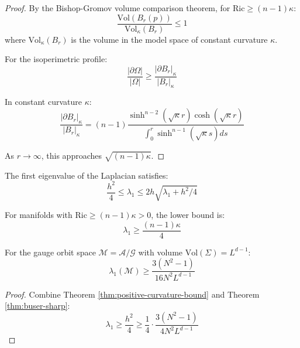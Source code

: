 \begin{proof}
By the Bishop-Gromov volume comparison theorem, for $\mathrm{Ric} \geq (n-1)\kappa$:
\begin{equation}
\frac{\mathrm{Vol}(B_r(p))}{\mathrm{Vol}_\kappa(B_r)} \leq 1
\end{equation}
where $\mathrm{Vol}_\kappa(B_r)$ is the volume in the model space of constant curvature $\kappa$.

For the isoperimetric profile:
\begin{equation}
\frac{|\partial \Omega|}{|\Omega|} \geq \frac{|\partial B_r|_\kappa}{|B_r|_\kappa}
\end{equation}

In constant curvature $\kappa$:
\begin{equation}
\frac{|\partial B_r|_\kappa}{|B_r|_\kappa} = (n-1)\frac{\sinh^{n-2}(\sqrt{\kappa}r)\cosh(\sqrt{\kappa}r)}{\int_0^r \sinh^{n-1}(\sqrt{\kappa}s)ds}
\end{equation}

As $r \to \infty$, this approaches $\sqrt{(n-1)\kappa}$.
\end{proof}

\begin{theorem}
\label{thm:buser-sharp}
The first eigenvalue of the Laplacian satisfies:
\begin{equation}
\frac{h^2}{4} \leq \lambda_1 \leq 2h\sqrt{\lambda_1 + h^2/4}
\end{equation}

For manifolds with $\mathrm{Ric} \geq (n-1)\kappa > 0$, the lower bound is:
\begin{equation}
\lambda_1 \geq \frac{(n-1)\kappa}{4}
\end{equation}
\end{theorem}

\begin{theorem}
\label{thm:spectral-gap-orbit}
For the gauge orbit space $\mathcal{M} = \mathcal{A}/\mathcal{G}$ with volume 
$\mathrm{Vol}(\Sigma) = L^{d-1}$:
\begin{equation}
\lambda_1(\mathcal{M}) \geq \frac{3(N^2-1)}{16N^2 L^{d-1}}
\end{equation}
\end{theorem}

\begin{proof}
Combine Theorem \ref{thm:positive-curvature-bound} and Theorem \ref{thm:buser-sharp}:
\begin{equation}
\lambda_1 \geq \frac{h^2}{4} \geq \frac{1}{4} \cdot \frac{3(N^2-1)}{4N^2 L^{d-1}}
\end{equation}
\end{proof}

